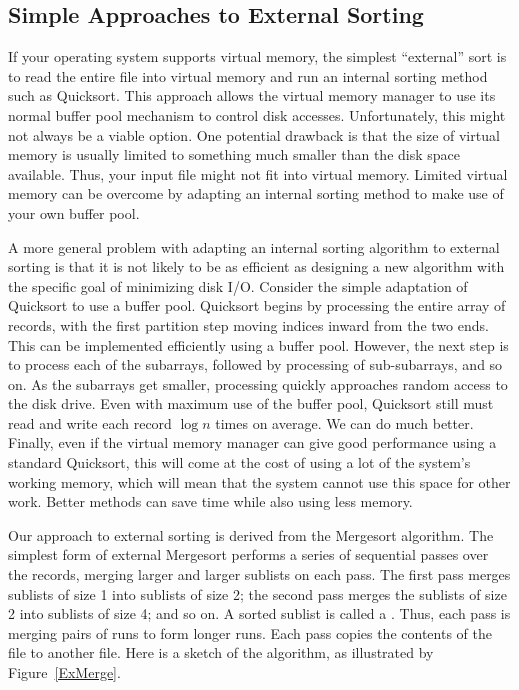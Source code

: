 \subsection{Simple Approaches to External Sorting}
\label{SimpleExSort}

If your operating system
supports virtual memory, the simplest
``external'' sort is to read the entire file into
virtual memory and run an internal sorting
method such as Quicksort.
This approach allows the virtual memory manager to use its normal
buffer pool mechanism to control disk accesses.
Unfortunately, this might not always be a viable option.
One potential drawback is that the size of virtual memory is
usually limited to something much smaller than the disk space
available.
Thus, your input file might not fit into virtual memory.
Limited virtual memory can be overcome by adapting an internal sorting
method to make use of your own buffer pool.

A more general problem with adapting an internal sorting algorithm
to external sorting is that it is not likely to be as efficient as
designing a new algorithm with the specific goal of minimizing
disk I/O.
Consider the simple adaptation of Quicksort
to use a buffer pool.
Quicksort begins by processing the entire array of records, with the
first partition step moving indices inward from the two ends.
This can be implemented efficiently using a buffer pool.
However, the next step is to process each of the subarrays,
followed by processing of sub-subarrays, and so on.
As the subarrays get smaller, processing quickly approaches
random access to the disk drive.
Even with maximum use of the buffer pool, Quicksort still must read
and write each record \(\log n\) times on average.
We can do much better.
Finally, even if the virtual memory manager can give good performance
using a standard Quicksort, this will come at the cost of using a lot
of the system's working memory, which will mean that the system cannot
use this space for other work.
Better methods can save time while also using less memory.

Our approach to external sorting is derived from the
Mergesort algorithm.
The simplest form of external Mergesort performs a series
of sequential passes over the records, merging larger and larger
sublists on each pass.
The first pass merges sublists of size 1 into sublists of
size 2; the second pass merges the sublists of size 2 into
sublists of size 4; and so on.
A sorted sublist is called a .
Thus, each pass is merging pairs of runs to form longer runs.
Each pass copies the contents of the file to
another file.
Here is a sketch of the algorithm, as illustrated by
Figure~\ref{ExMerge}.

